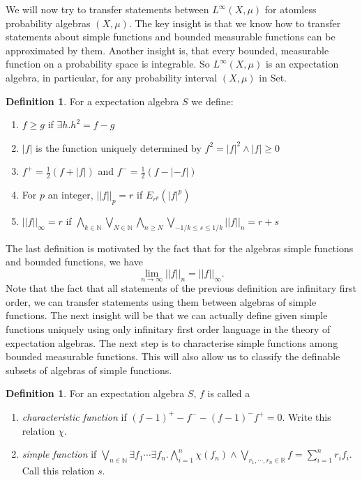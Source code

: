 \documentclass[a4paper]{amsproc}
\theoremstyle{plain}
\theoremstyle{definition}
\newtheorem{definition}[theorem]{Definition}
\theoremstyle{remark}
\numberwithin{equation}{section}
\begin{document}
We will now try to transfer statements between $L^\infty(X,\mu)$ for atomless probability algebras $(X,\mu)$. The key insight is that we know how to transfer statements about simple functions and bounded measurable functions can be approximated by them. Another insight is, that every bounded, measurable function on a probability space is integrable. So $L^\infty(X,\mu)$ is an expectation algebra, in particular, for any probability interval $(X,\mu)$ in Set.
\begin{definition} For a expectation algebra $S$ we define:
\begin{enumerate}
\item $f\geq g$ if $\exists h. h^2=f-g$
\item $|f|$ is the function uniquely determined by $f^2=|f|^2\wedge |f|\geq 0$
\item $f^+=\frac{1}{2}(f+|f|)$ and $f^-=\frac{1}{2}(f-|-f|)$ 
\item For $p$ an integer, $||f||_p=r$ if $E_{r^p}(|f|^p)$
\item $||f||_\infty=r$ if $\bigwedge_{k\in\mathbb{N}}\bigvee_{N\in\mathbb{N}}\bigwedge_{n\geq N}\bigvee_{-1/k\leq s\leq 1/k}||f||_{n}=r+s$

\end{enumerate}
\end{definition}
The last definition is motivated by the fact that for the algebras simple functions and bounded functions, we have
\[  \lim_{n\rightarrow \infty} ||f||_n=||f||_\infty. \]
Note that the fact that all statements of the previous definition are infinitary first order, we can transfer statements using them between algebras of simple functions. The next insight will be that we can actually define given simple functions uniquely using only infinitary first order language in the theory of expectation algebras.\newline
\indent The next step is to characterise simple functions among bounded measurable functions. This will also allow us to classify the definable subsets of algebras of simple functions.
\begin{definition} For an expectation algebra $S$, $f$ is called a
\begin{enumerate}\item \emph{characteristic function} if $(f-1)^+-f^- -(f-1)^-f^+=0$. Write this relation $\chi$.
\item \emph{simple function} if $\bigvee_{n\in \mathbb{N}}\exists f_1 \cdots \exists f_n. \bigwedge_{i=1}^n \chi(f_n)\wedge \bigvee_{r_1,\cdots,r_n\in\mathbb{R}} f=\sum_{i=1}^n r_if_i$. Call this relation $s$.
\end{enumerate}
\end{definition}
\end{document}
